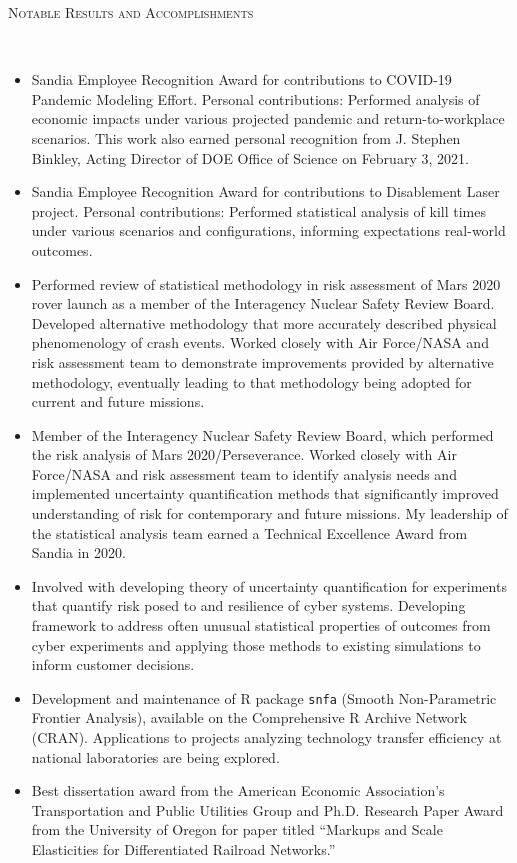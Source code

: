 \documentclass[11pt]{article}
\newenvironment{changemargin}[2]{%
  \begin{list}{}{%
    \setlength{\topsep}{0pt}%
    \setlength{\leftmargin}{#1}%
    \setlength{\rightmargin}{#2}%
    \setlength{\listparindent}{\parindent}%
    \setlength{\itemindent}{\parindent}%
    \setlength{\parsep}{\parskip}%
  }%
  \item[]}{\end{list}
}
\newcommand{\lineover}{
	\begin{changemargin}{-0.05in}{-0.05in}
		\vspace*{-8pt}
		\hrulefill \\
		\vspace*{-2pt}
	\end{changemargin}
}
\newcommand{\header}[1]{
	\begin{changemargin}{-0.5in}{-0.5in}
		\scshape{#1}\\
	\vspace*{-5pt}
  	\lineover
	\end{changemargin}
}
\newenvironment{body} {
	\vspace*{-16pt}
	\begin{changemargin}{-0.25in}{-0.5in}
  }	
	{\end{changemargin}
}
\begin{document}
\smallskip
\header{Notable Results and Accomplishments}
\begin{body}
	\vspace{14pt}
	\begin{itemize}
		\item Sandia Employee Recognition Award for contributions to COVID-19 Pandemic Modeling Effort. Personal contributions: Performed analysis of economic impacts under various projected pandemic and return-to-workplace scenarios. This work also earned personal recognition from J. Stephen Binkley, Acting Director of DOE Office of Science on February 3, 2021.
		\item Sandia Employee Recognition Award for contributions to Disablement Laser project. Personal contributions: Performed statistical analysis of kill times under various scenarios and configurations, informing expectations real-world outcomes.
		\item Performed review of statistical methodology in risk assessment of Mars 2020 rover launch as a member of the Interagency Nuclear Safety Review Board. Developed alternative methodology that more accurately described physical phenomenology of crash events. Worked closely with Air Force/NASA and risk assessment team to demonstrate improvements provided by alternative methodology, eventually leading to that methodology being adopted for current and future missions.
		\item Member of the Interagency Nuclear Safety Review Board, which performed the risk analysis of Mars 2020/Perseverance. Worked closely with Air Force/NASA and risk assessment team to identify analysis needs and implemented uncertainty quantification methods that significantly improved understanding of risk for contemporary and future missions. My leadership of the statistical analysis team earned a Technical Excellence Award from Sandia in 2020.
		\item Involved with developing theory of uncertainty quantification for experiments that quantify risk posed to and resilience of cyber systems. Developing framework to address often unusual statistical properties of outcomes from cyber experiments and applying those methods to existing simulations to inform customer decisions.
		\item Development and maintenance of R package \texttt{snfa} (Smooth Non-Parametric Frontier Analysis), available on the Comprehensive R Archive Network (CRAN). Applications to projects analyzing technology transfer efficiency at national laboratories are being explored.
		\item Best dissertation award from the American Economic Association's Transportation and Public Utilities Group and Ph.D. Research Paper Award from the University of Oregon for paper titled ``Markups and Scale Elasticities for Differentiated Railroad Networks.''
	\end{itemize}
\end{body}
\end{document}
